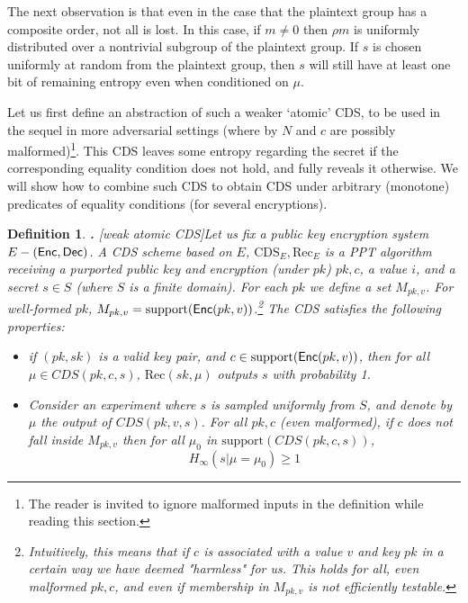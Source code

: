 \documentclass[11pt]{article}
\newcommand{\support}{{\mathrm{support}}}
\newtheorem{DEFINITION}{Definition}[section]
\newenvironment{definition}{\begin{DEFINITION} \hspace{-.85em} {\bf .} \rm}%
	{\end{DEFINITION}}
\newcommand{\enc}{{\sf Enc}}
\newcommand{\dec}{{\sf Dec}}
\begin{document}
The next observation is that even in the case that the plaintext
group has a composite order, not all is lost. In this case, if
$m\neq 0$ then $\rho m$ is uniformly distributed over a nontrivial
subgroup of the plaintext group. If $s$ is chosen uniformly at
random from the plaintext group, then $s$ will still have at least
one bit of remaining entropy even when conditioned on $\mu$.
 
Let us first define an abstraction of such a weaker `atomic' CDS, to be used in the sequel in more adversarial settings (where by $N$ and $c$ are possibly malformed)\footnote{The reader is invited to ignore malformed inputs in the definition while reading this section.}. This CDS leaves some entropy regarding the secret if the corresponding equality condition does not hold, and fully reveals it otherwise. We will show how to combine such CDS to obtain CDS under arbitrary (monotone) predicates of equality conditions (for several encryptions).

\begin{definition}[weak atomic CDS]\label{def-wa-cds}
	Let us fix a public key encryption system $E-(\enc,\dec)$. A CDS scheme based on $E$, $\text{CDS}_E,\text{Rec}_E$ is a PPT algorithm receiving a purported public key and encryption (under $pk$) $pk,c$, a value $i$, and a secret $s\in S$ (where $S$ is a finite domain). For each $pk$ we define a set $M_{pk,v}$. For well-formed $pk$, $M_{pk,v}=\support(\enc(pk,v))$.\footnote{Intuitively, this means that if $c$ is associated with a value $v$ and key $pk$ in a certain way we have deemed "harmless" for us. This holds for all, even malformed $pk,c$, and even if membership in $M_{pk,v}$ is not efficiently testable.}
	The CDS satisfies the following properties:
	\begin{itemize}
	\item[Correctness:] if $(pk,sk)$ is a valid key pair, and $c\in \support(\enc(pk,v))$, then for all $\mu \in CDS(pk,c,s)$, $\text{Rec}(sk,\mu)$ outputs $s$ with probability 1.
	\item[Hiding:] Consider an experiment where $s$ is sampled uniformly from $S$, and denote by $\mu$ the output of $CDS(pk,v,s)$. For all $pk,c$ (even malformed), if $c$ does not fall inside $M_{pk,v}$ then for all $\mu_0$ in $\support(CDS(pk,c,s))$,	
	\begin{equation}\label{eq-cds}
		H_\infty(s|\mu = \mu_0)\geq 1
	\end{equation}
	\end{itemize}
\end{definition} 
\end{document}
